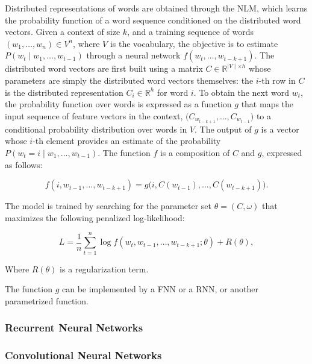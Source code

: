 Distributed representations of words are obtained through the \ac{NLM}, which learns the probability function of a word sequence conditioned on the distributed word vectors. Given a context of size $k$, and a training sequence of words $(w_1, \ldots, w_n) \in V^n$, where $V$ is the vocabulary, the objective is to estimate $P(w_t \mid w_1, \ldots, w_{t-1})$ through a neural network $f(w_t, \ldots, w_{t-k+1})$. The distributed word vectors are first built using a matrix $C \in \mathbb{R}^{\mid V \mid \times h}$ whose parameters are simply the distributed word vectors themselves: the $i$-th row in $C$ is the distributed representation $C_i \in \mathbb{R}^h$ for word $i$. To obtain the next word $w_t$, the probability function over words is expressed as a function $g$ that maps the input sequence of feature vectors in the context, $\bigl(C_{w_{t-k+1}}, \ldots, C_{w_{t-1}}\bigr)$ to a conditional probability distribution over words in $V$. The output of $g$ is a vector whose $i$-th element provides an estimate of the probability $P(w_t = i \mid w_1, \ldots, w_{t-1})$. The function $f$ is a composition of $C$ and $g$, expressed as follows:

\begin{equation}
    f(i, w_{t-1}, \ldots, w_{t-k+1}) = g\bigl(i, C(w_{t-1}), \ldots, C(w_{t-k+1})\bigr).
\end{equation}

The model is trained by searching for the parameter set $\theta = (C, \omega)$ that maximizes the following penalized log-likelihood:

\begin{equation}
    L = \frac{1}{n} \sum_{t=1}^n \log f(w_t, w_{t-1}, \ldots, w_{t-k+1}; \theta) + R(\theta),
\end{equation}

\noindent Where $R(\theta)$ is a regularization term.

The function $g$ can be implemented by a \ac{FNN} or a \ac{RNN}, or another parametrized function.


\subsubsection{Recurrent Neural Networks}

\subsubsection{Convolutional Neural Networks}


